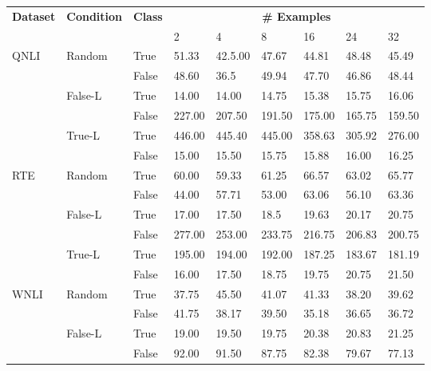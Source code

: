 \begin{table*}[h!]
\centering
\small
\begin{tabular}{lllllllll}
  \toprule
  \multirow{2}{*}{\textbf{Dataset}} & \multirow{2}{*}{\textbf{Condition}} & \multirow{2}{*}{\textbf{Class}} & \multicolumn{6}{c}{\textbf{\# Examples}}\\
  \cmidrule{4-9}
  & & & 2 & 4 & 8 & 16 & 24 & 32 \\
  \midrule
  \multirow{6}{*}{QNLI} & \multirow{2}{*}{Random} & True & 51.33 & 42.5.00 & 47.67 & 44.81 & 48.48 & 45.49 \\
  \cmidrule{3-9}
  & & False & 48.60 & 36.5 & 49.94 & 47.70 & 46.86 & 48.44 \\
  \cmidrule{2-9}
  & \multirow{2}{*}{False-L} & True & 14.00 & 14.00 & 14.75 & 15.38 & 15.75 & 16.06 \\
  \cmidrule{3-9}
  & & False & 227.00 & 207.50 & 191.50 & 175.00 & 165.75 & 159.50 \\
  \cmidrule{2-9}
  & \multirow{2}{*}{True-L} & True & 446.00 & 445.40 & 445.00 & 358.63 & 305.92 & 276.00 \\
  \cmidrule{3-9}
  & & False & 15.00 & 15.50 & 15.75 & 15.88 & 16.00 & 16.25 \\  
\midrule
  \multirow{6}{*}{RTE} & \multirow{2}{*}{Random} & True & 60.00 & 59.33 & 61.25 & 66.57 & 63.02 & 65.77 \\
  \cmidrule{3-9}
  & & False & 44.00 & 57.71 & 53.00 & 63.06 & 56.10 & 63.36 \\
  \cmidrule{2-9}
  & \multirow{2}{*}{False-L} & True & 17.00 & 17.50 & 18.5 & 19.63 & 20.17 & 20.75 \\
  \cmidrule{3-9}
  & & False & 277.00 & 253.00 & 233.75 & 216.75 & 206.83 & 200.75 \\
  \cmidrule{2-9}
  & \multirow{2}{*}{True-L} & True & 195.00 & 194.00 & 192.00 & 187.25 & 183.67 & 181.19 \\
  \cmidrule{3-9}
  & & False & 16.00 & 17.50 & 18.75 & 19.75 & 20.75 & 21.50 \\  
  \midrule
  \multirow{6}{*}{WNLI} & \multirow{2}{*}{Random} & True & 37.75 & 45.50 & 41.07 & 41.33 & 38.20 & 39.62 \\
  \cmidrule{3-9}
  & & False & 41.75 & 38.17 & 39.50 & 35.18 & 36.65 & 36.72 \\
  \cmidrule{2-9}
  & \multirow{2}{*}{False-L} & True & 19.00 & 19.50 & 19.75 & 20.38 & 20.83 & 21.25 \\
  \cmidrule{3-9}
  & & False & 92.00 & 91.50 & 87.75 & 82.38 & 79.67 & 77.13 \\

\end{tabular}
\end{table*}
